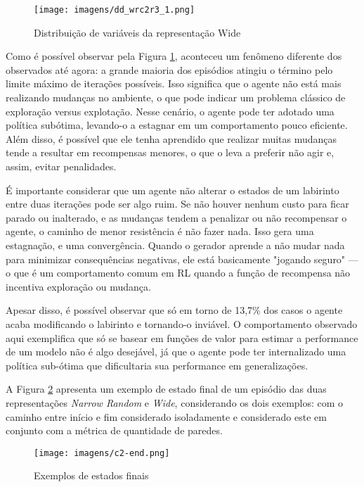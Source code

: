 \begin{figure}[htb]
	\caption{\label{dd_wrc2r3_1}Distribuição de variáveis da representação Wide}
	\begin{center}
	    \texttt{[image: imagens/dd\_wrc2r3\_1.png]}
	\end{center}
\end{figure}

\FloatBarrier

Como é possível observar pela Figura \ref{dd_wrc2r3_1}, aconteceu um fenômeno diferente dos observados até agora: 
a grande maioria dos episódios
atingiu o término pelo limite máximo de iterações possíveis.
Isso significa que o agente não está mais realizando mudanças no ambiente, 
o que pode indicar um problema clássico de exploração versus explotação. 
Nesse cenário, o agente pode ter adotado uma política subótima, levando-o a estagnar em um comportamento pouco eficiente. 
Além disso, é possível que ele tenha aprendido que realizar muitas mudanças tende a resultar em recompensas menores, 
o que o leva a preferir não agir e, assim, evitar penalidades.

É importante considerar que um agente não alterar o estados de um labirinto entre 
duas iterações pode ser algo ruim. Se não houver nenhum custo para ficar 
parado ou inalterado, e as mudanças tendem a penalizar ou não recompensar o agente, 
o caminho de menor resistência é não fazer nada. Isso gera uma estagnação, e uma 
convergência. Quando o gerador aprende a não mudar nada para minimizar consequências 
negativas, ele está basicamente "jogando seguro" — o que é um comportamento comum em 
RL quando a função de recompensa não incentiva exploração ou mudança. 


Apesar disso, é possível observar que só em torno de 13,7\% dos casos o agente acaba modificando o labirinto
e tornando-o inviável. O comportamento observado aqui exemplifica que só se basear em funções de valor para
estimar a performance de um modelo não é algo desejável, já que o agente pode ter internalizado uma política
sub-ótima que dificultaria sua performance em generalizações.

A Figura \ref{c2-end} apresenta um exemplo de estado final de um episódio das duas representações 
\textit{Narrow Random} e \textit{Wide},
considerando os dois exemplos: com o caminho entre início e fim considerado isoladamente e 
considerado este em conjunto com a métrica de quantidade de paredes.

\begin{figure}[htb]
	\caption{\label{c2-end}Exemplos de estados finais}
	\begin{center}
	    \texttt{[image: imagens/c2-end.png]}
	\end{center}
\end{figure}

